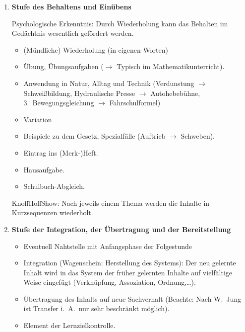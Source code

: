 \begin{enumerate}
	\item {\bf Stufe des Behaltens und Ein\"{u}bens}
	
	Psychologische Erkenntnis:
	Durch Wiederholung kann das Behalten im
	Ged\"{a}chtnis wesentlich gef\"{o}rdert werden.
	
	\begin{itemize}
		\item (M\"{u}ndliche) Wiederholung (in eigenen Worten)
		\item \"{U}bung, \"{U}bungsaufgaben
		($\to$ Typisch im Mathematikunterricht).
		\item Anwendung in Natur, Alltag und Technik (Verdunstung $\to$
		Schwei{\ss}bildung, Hydraulische Presse $\to$ Autohebeb\"{u}hne,
		3.\ Bewegungsgleichung $\to$ Fahrschulformel)
		\item Variation
		\item Beispiele zu dem Gesetz,
		Spezialf\"{a}lle (Auftrieb $\to$ Schweben).
		\item Eintrag ins (Merk-)Heft.
		\item Hausaufgabe.
		\item Schulbuch-Abgleich.
	\end{itemize}
	
	\begin{beisp}
		KnoffHoffShow:
	Nach jeweils einem Thema werden die Inhalte in
	Kurzsequenzen wiederholt.
	\end{beisp}
	
	\item {\bf Stufe der Integration, der \"{U}bertragung und
	der Bereitstellung}
	
	\begin{itemize}
		\item Eventuell Nahtstelle mit Anfangsphase der Folgestunde
		\item Integration (Wagenschein: Herstellung des Systems):
		Der neu gelernte Inhalt wird in das System der fr\"{u}her
		gelernten Inhalte auf vielf\"{a}ltige Weise
		eingef\"{u}gt (Verkn\"{u}pfung, Assoziation, Ordnung,\dots).
		\item \"{U}bertragung des Inhalts auf neue Sachverhalt
		(Beachte: Nach W.\ Jung ist Transfer i.~A.\ nur sehr
		beschr\"{a}nkt m\"{o}glich).
		\item Element der Lernzielkontrolle.
	\end{itemize}
\end{enumerate}
	
